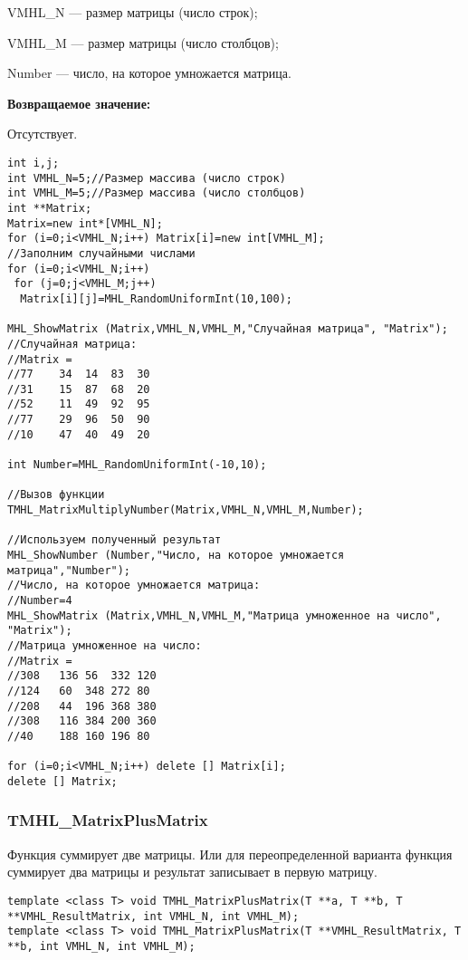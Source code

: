 \documentclass[a4paper,12pt]{article}
\begin{document}
 VMHL\_N --- размер матрицы (число строк);
 
 VMHL\_M --- размер матрицы (число столбцов);
 
 Number --- число, на которое умножается матрица.

\textbf{Возвращаемое значение:}

Отсутствует.


\begin{lstlisting}[label=code_use_TMHL_MatrixMultiplyNumber,caption=Пример использования]
int i,j;
int VMHL_N=5;//Размер массива (число строк)
int VMHL_M=5;//Размер массива (число столбцов)
int **Matrix;
Matrix=new int*[VMHL_N];
for (i=0;i<VMHL_N;i++) Matrix[i]=new int[VMHL_M];
//Заполним случайными числами
for (i=0;i<VMHL_N;i++)
 for (j=0;j<VMHL_M;j++)
  Matrix[i][j]=MHL_RandomUniformInt(10,100);

MHL_ShowMatrix (Matrix,VMHL_N,VMHL_M,"Случайная матрица", "Matrix");
//Случайная матрица:
//Matrix =
//77	34	14	83	30
//31	15	87	68	20
//52	11	49	92	95
//77	29	96	50	90
//10	47	40	49	20

int Number=MHL_RandomUniformInt(-10,10);

//Вызов функции
TMHL_MatrixMultiplyNumber(Matrix,VMHL_N,VMHL_M,Number);

//Используем полученный результат
MHL_ShowNumber (Number,"Число, на которое умножается матрица","Number");
//Число, на которое умножается матрица:
//Number=4
MHL_ShowMatrix (Matrix,VMHL_N,VMHL_M,"Матрица умноженное на число", "Matrix");
//Матрица умноженное на число:
//Matrix =
//308	136	56	332	120
//124	60	348	272	80
//208	44	196	368	380
//308	116	384	200	360
//40	188	160	196	80

for (i=0;i<VMHL_N;i++) delete [] Matrix[i];
delete [] Matrix;
\end{lstlisting}

\subsubsection{TMHL\_MatrixPlusMatrix}\label{TMHL_MatrixPlusMatrix}

Функция суммирует две матрицы. Или для переопределенной варианта функция суммирует два матрицы и результат записывает в первую матрицу. 


\begin{lstlisting}[label=code_syntax_TMHL_MatrixPlusMatrix,caption=Синтаксис]
template <class T> void TMHL_MatrixPlusMatrix(T **a, T **b, T **VMHL_ResultMatrix, int VMHL_N, int VMHL_M);
template <class T> void TMHL_MatrixPlusMatrix(T **VMHL_ResultMatrix, T **b, int VMHL_N, int VMHL_M);
\end{lstlisting}
\end{document}
